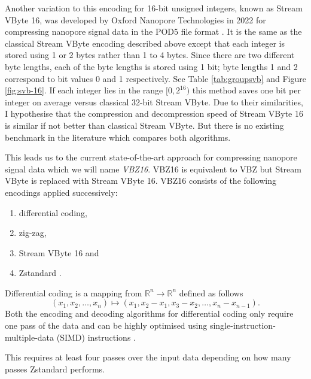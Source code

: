 %


Another variation to this encoding for 16-bit unsigned integers, known as Stream VByte 16, was developed by Oxford Nanopore Technologies in 2022 for compressing nanopore signal data in the POD5 file format \cite{pod5}. It is the same as the classical Stream VByte encoding described above except that each integer is stored using 1 or 2 bytes rather than 1 to 4 bytes. Since there are two different byte lengths, each of the byte lengths is stored using 1 bit; byte lengths 1 and 2 correspond to bit values 0 and 1 respectively. See Table \ref{tab:groupsvb} and Figure \ref{fig:svb-16}. If each integer lies in the range $[0, 2^{16})$ this method saves one bit per integer on average versus classical 32-bit Stream VByte. Due to their similarities, I hypothesise that the compression and decompression speed of Stream VByte 16 is similar if not better than classical Stream VByte. But there is no existing benchmark in the literature which compares both algorithms.



This leads us to the current state-of-the-art approach for compressing nanopore signal data which we will name \textit{VBZ16}. VBZ16 is equivalent to VBZ \cite{vbz} but Stream VByte is replaced with Stream VByte 16. VBZ16 consists of the following encodings applied successively:

\begin{enumerate}
\item differential coding,
\item zig-zag,
\item Stream VByte 16 and
\item Zstandard \cite{zstd}.
\end{enumerate}

Differential coding is a mapping from $\mathbb{R}^n\to\mathbb{R}^n$ defined as follows
\[ (x_1, x_2, \dots, x_n) \mapsto (x_1, x_2 - x_1, x_3-x_2,\dots,x_n-x_{n-1}). \]
Both the encoding and decoding algorithms for differential coding only require one pass of the data and can be highly optimised using single-instruction-multiple-data (SIMD) instructions \cite{lemire-simd}.

This requires at least four passes over the input data depending on how many passes Zstandard performs.
